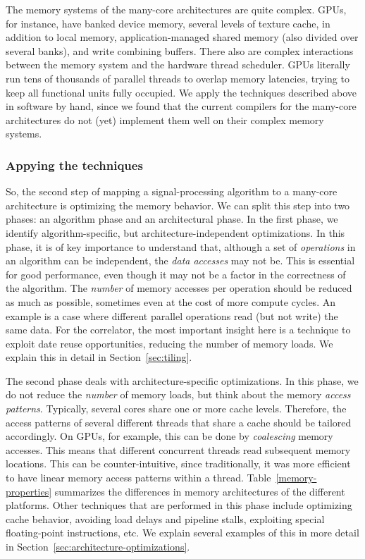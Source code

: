 \documentclass{article}
\begin{document}
The memory systems of the many-core architectures are quite
complex. GPUs, for instance, have banked device memory, several levels of texture cache,
in addition to local memory, application-managed
shared memory (also divided over several banks), and write combining buffers.
There also are complex interactions between the memory
system and the hardware thread scheduler.
GPUs literally run tens of thousands of parallel threads
to overlap memory latencies, trying to keep all functional units fully occupied.
We apply the techniques described
above in software by hand, since we found that the current compilers
for the many-core architectures do not (yet) implement them well on
their complex memory systems.



\subsubsection{Appying the techniques}

So, the second step of mapping a signal-processing algorithm to a many-core architecture
is optimizing the memory behavior. We can split this step into two phases:
an algorithm phase and an architectural phase.
In the first phase, we identify algorithm-specific, but
architecture-independent optimizations. 
In this phase, it is of key importance to understand that, although a
set of \emph{operations} in an algorithm can be independent, the \emph{data
  accesses} may not be.  This is essential for good performance, even though it may not be a
factor in the correctness of the algorithm. The \emph{number} of memory accesses per operation should
be reduced as much as possible, sometimes even at the cost of more
compute cycles. An example is a case
where different parallel operations read (but not write) the
same data.  For the correlator, the most important insight here
is a technique to exploit date reuse opportunities, reducing the number of memory
loads. We explain this in detail in Section~\ref{sec:tiling}.

The second phase deals with architecture-specific optimizations.
In this phase, we do not reduce the \emph{number} of memory loads, but think about the
memory \emph{access patterns}. Typically, several cores share one or
more cache levels. Therefore, the access patterns of several different
threads that share a cache should be tailored accordingly. On GPUs,
for example, this can be done by \emph{coalescing} memory accesses.
This means that different concurrent threads read subsequent memory
locations.  This can be counter-intuitive, since traditionally, it was
more efficient to have linear memory access patterns within a
thread. Table~\ref{memory-properties} summarizes the differences in
memory architectures of the different platforms.
Other techniques that are performed in this phase include optimizing cache
behavior, avoiding load delays and pipeline stalls, exploiting special floating-point instructions, etc.
We explain several examples of this in more detail in Section~\ref{sec:architecture-optimizations}.
\end{document}
